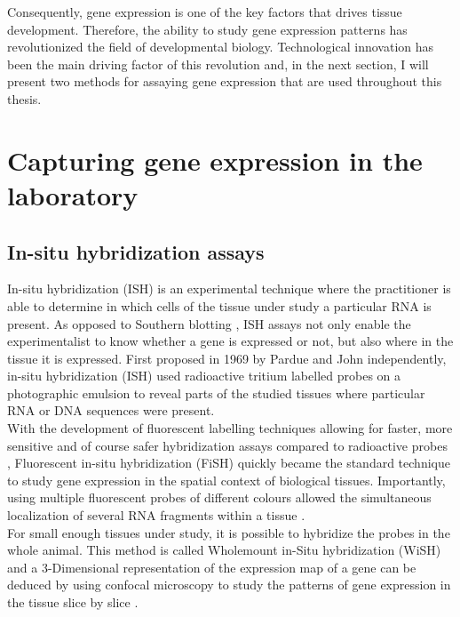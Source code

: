 	Consequently, gene expression is one of the key factors that drives tissue development. Therefore, the ability to study gene expression patterns has revolutionized the field of developmental biology. Technological innovation has been the main driving factor of this revolution and, in the next section, I will present two methods for assaying gene expression that are used throughout this thesis.


\section{Capturing gene expression in the laboratory}\label{sec:gene_expression_lab}
     \subsection{In-situ hybridization assays}
     In-situ hybridization (ISH) is an experimental technique where the practitioner is able to determine in which cells of the tissue under study a particular RNA is present. As opposed to Southern blotting \citep{southern75}, ISH assays not only enable the experimentalist to know whether a gene is expressed or not, but also where in the tissue it is expressed. First proposed in 1969 by Pardue \citep{pardue69} and John \citep{john69} independently, in-situ hybridization (ISH) used radioactive tritium labelled probes on a photographic emulsion to reveal parts of the studied tissues where particular RNA or DNA sequences were present.\\
     
      With the development of fluorescent labelling techniques \citep{landegent84,pinkel88} allowing for faster, more sensitive and of course safer hybridization assays compared to radioactive probes \citep{swiger96}, Fluorescent in-situ hybridization (FiSH) quickly became the standard technique to study gene expression in the spatial context of biological tissues. Importantly, using multiple fluorescent probes of different colours allowed the simultaneous localization of several RNA fragments within a tissue \citep{nederlof89}.\\
     
     For small enough tissues under study, it is possible to hybridize the probes in the whole animal. This method is called Wholemount in-Situ hybridization (WiSH) and a 3-Dimensional representation of the expression map of a gene can be deduced by using confocal microscopy to study the patterns of gene expression in the tissue slice by slice \citep{Tomer10}.
     

